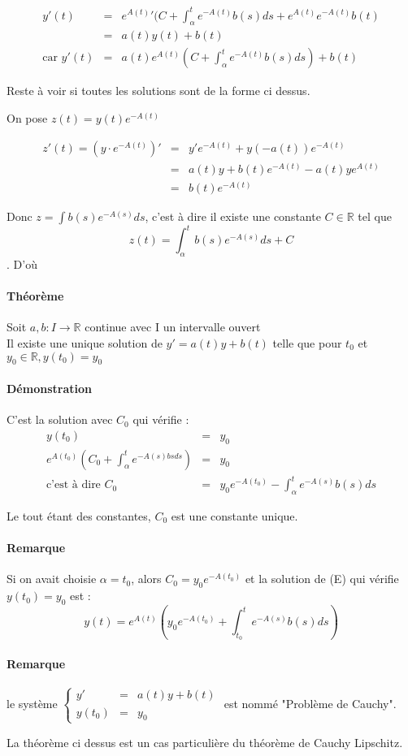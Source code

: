 	\[\begin{array}{rcl}
			y'(t) &=& {e^{A(t)}} '(C + \int_\alpha^t e^{-A(t)} b(s)ds + e^{A(t)} e^{-A(t)} b(t) \\
						   &=& a(t) y(t) + b(t) \\
	\text{car } y'(t) &=& a(t)e^{A(t)}(C + \int_\alpha^t e^{-A(t)}b(s)ds) + b(t)\end{array}\]

	Reste à voir si toutes les solutions sont de la forme ci dessus.

	On pose $z(t) = y(t) e^{-A(t)}$

	\[\begin{array}{rcl}
			z'(t) = (y\cdot e^{-A(t)})' &=& y'e^{-A(t)} + y(-a(t))e^{-A(t)} \\
				   &=& a(t)y + b(t)e^{-A(t)} - a(t)ye^{A(t)} \\
					  &=& b(t)e^{-A(t)} \end{array}\]

			Donc $z = \int b(s)e^{-A(s)} ds$, c'est à dire il existe une constante $C \in \mathbb{R}$ tel que \[z(t) = \int_\alpha^t b(s)e^{-A(s)}ds + C\]. D'où 
			\begin{center}
			\end{center}

			\paragraph{Théorème}
			Soit $a, b : I \rightarrow \mathbb{R}$ continue avec I un intervalle ouvert ~\\
			Il existe une unique solution de $y' = a(t) y + b(t)$ telle que pour $t_0$ et $y_0 \in \mathbb{R}, y(t_0) = y_0$

			\paragraph{Démonstration} C'est la solution avec $C_0$ qui vérifie : \[\begin{array}{rcl}
					y(t_0) &=& y_0 \\
					e^{A(t_0)}(C_0 + \int_\alpha^t e^{-A(s)bsds}) &=& y_0 \\
			\text{c'est à dire } C_0 &=& y_0e^{-A(t_0)} - \int_\alpha^t e^{-A(s)}b(s)ds\end{array}\]

Le tout étant des constantes, $C_0$ est une constante unique.

\paragraph{Remarque} Si on avait choisie $\alpha = t_0$, alors $C_0 = y_0e^{-A(t_0)}$ et la solution de (E) qui vérifie $y(t_0)=y_0$ est : \[y(t) = e^{A(t)}(y_0e^{-A(t_0)} + \int_{t_0}^t e^{-A(s)}b(s) ds)\]

\paragraph{Remarque} le système $\left\{\begin{array}{rcl} y' &=& a(t)y + b(t) \\
y(t_0) &=& y_0\end{array}\right.$ est nommé "Problème de Cauchy".

La théorème ci dessus est un cas particulière du théorème de Cauchy Lipschitz.
